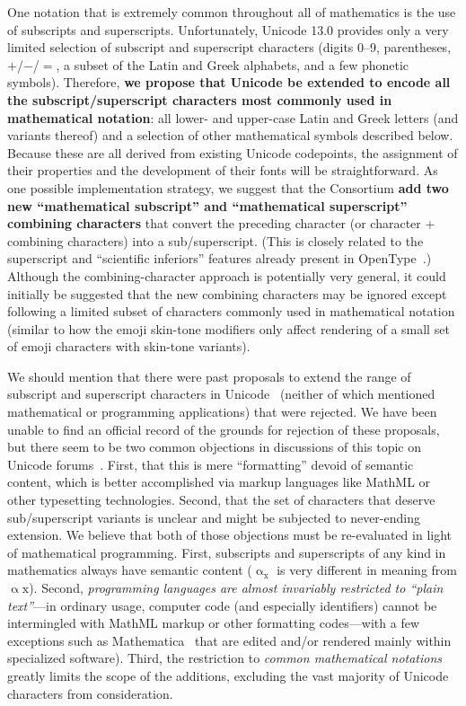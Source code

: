\documentclass[10pt,english]{article}
\begin{document}
One notation that is extremely common throughout all of mathematics
is the use of subscripts and superscripts. Unfortunately, Unicode
13.0 provides only a very limited selection of subscript and superscript
characters (digits 0--9, parentheses, $+$/$-$/$=$, a subset of
the Latin and Greek alphabets, and a few phonetic symbols). Therefore,\textbf{
we propose that Unicode be extended to encode all the subscript/superscript
characters most commonly used in mathematical notation}: all lower-
and upper-case Latin and Greek letters (and variants thereof) and
a selection of other mathematical symbols described below. Because
these are all derived from existing Unicode codepoints, the assignment
of their properties and the development of their fonts will be straightforward.
As one possible implementation strategy, we suggest that the Consortium
\textbf{add two new ``mathematical subscript'' and ``mathematical
superscript'' combining characters} that convert the preceding character
(or character + combining characters) into a sub/superscript. (This is
closely related to the superscript and ``scientific
inferiors'' features already present in OpenType~\cite{OpenType}.)
Although the combining-character approach is potentially very general, it could
initially be suggested that the new combining characters may be ignored
except following a limited subset of characters commonly used in
mathematical notation (similar to how the emoji skin-tone modifiers only affect
rendering of a small set of emoji characters with skin-tone variants).

We should mention that there were past proposals to extend the range
of subscript and superscript characters in Unicode~\cite{L2-10-230,L2-11-208}
(neither of which mentioned mathematical or programming applications)
that were rejected. We have been unable to find an official record
of the grounds for rejection of these proposals, but there seem to
be two common objections in discussions of this topic on Unicode forums~\cite{Miller10,UCDF}.
First, that this is mere ``formatting''
devoid of semantic content, which is better accomplished via markup
languages like MathML or other typesetting technologies. Second, that
the set of characters that deserve sub/superscript variants is unclear
and might be subjected to never-ending extension. We believe that
both of those objections must be re-evaluated in light of mathematical
programming. First, subscripts and superscripts of any kind in mathematics
always have semantic content ($\mathrm{{\upalpha_{x}}}$ is very different
in meaning from $\mathrm{\upalpha\mathrm{{x}}}$). Second, \emph{programming
languages are almost invariably restricted to ``plain text''}---in
ordinary usage, computer code (and especially identifiers) cannot
be intermingled with MathML markup or other formatting codes---with
a few exceptions such as Mathematica~\cite{Mathematica} that are
edited and/or rendered mainly within specialized software). Third,
the restriction to
\emph{common mathematical notations} greatly limits the scope
of the additions, excluding the vast majority of Unicode characters
from consideration.
\end{document}
